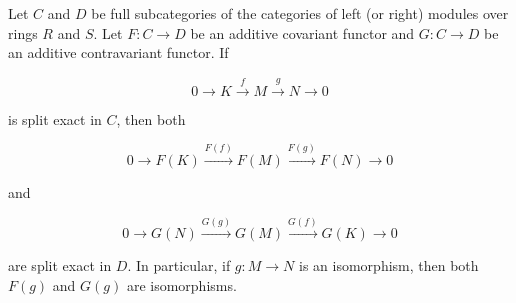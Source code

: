 Let $C$ and $D$ be full subcategories of the categories of left (or right) modules over rings $R$ and $S$. Let $F: C \to D$ be an additive covariant functor and $G: C \to D$ be an additive contravariant functor. If

$$0 \to K \xrightarrow{f} M \xrightarrow{g} N \to 0$$

is split exact in $C$, then both

$$0 \to F(K) \xrightarrow{F(f)} F(M) \xrightarrow{F(g)} F(N) \to 0$$

and

$$0 \to G(N) \xrightarrow{G(g)} G(M) \xrightarrow{G(f)} G(K) \to 0$$

are split exact in $D$. In particular, if $g: M \to N$ is an isomorphism, then both $F(g)$ and $G(g)$ are isomorphisms.
